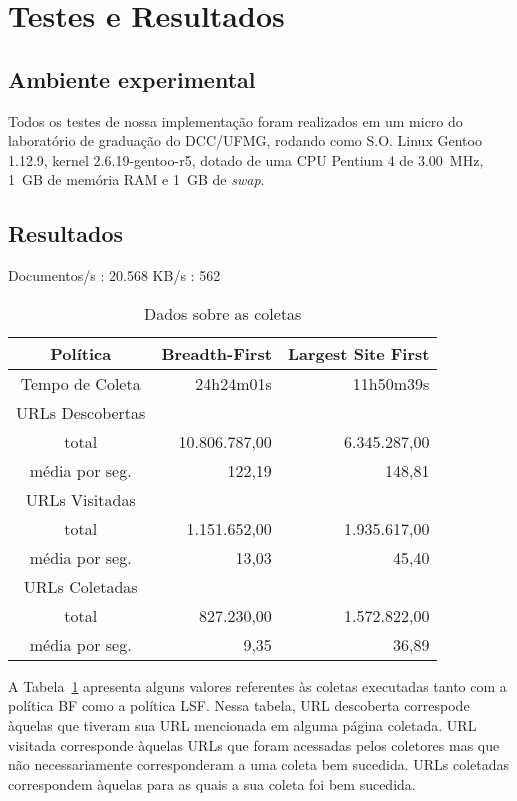 \documentclass[10pt,twocolumn]{article}
\begin{document}
\section{Testes e Resultados}

\subsection{Ambiente experimental}

Todos os testes de nossa implementação foram realizados em um micro do
laboratório de graduação do DCC/UFMG, rodando como S.O. Linux Gentoo
1.12.9, kernel 2.6.19-gentoo-r5, dotado de uma CPU Pentium 4 de
3.00~MHz, 1~GB de memória RAM e 1~GB de \emph{swap}.

\subsection{Resultados}

Documentos/s : 20.568
KB/s : 562


\begin{table}[htbp]
\centering
\begin{tabular}{|c|r|r|} \hline
Política	&  Breadth-First	& Largest Site First	\\
\hline\hline
Tempo de Coleta &   24h24m01s		&	11h50m39s	\\\hline
URLs Descobertas& & \\
	total	& 	10.806.787,00	&	6.345.287,00	\\
média por seg.	&		122,19  &	      148,81	\\\hline
URLs Visitadas	& & \\
	total	& 	  1.151.652,00	&	1.935.617,00	\\
média por seg.	&		 13,03  &	       45,40	\\\hline
URLs Coletadas	& & \\
	total	& 	    827.230,00	&	1.572.822,00	\\
média por seg.	&		  9,35  & 	       36,89	\\\hline
\hline
\end{tabular}
\caption{Dados sobre as coletas}
\label{tab:sumario}
\end{table}


A Tabela~\ref{tab:sumario} apresenta alguns valores referentes às
coletas executadas tanto com a política BF como a política LSF.
Nessa tabela, URL descoberta correspode àquelas que tiveram sua URL
mencionada em alguma página coletada. URL visitada corresponde àquelas
URLs que foram acessadas pelos coletores mas que não necessariamente
corresponderam a uma coleta bem sucedida. URLs coletadas correspondem
àquelas para as quais a sua coleta foi bem sucedida.
\end{document}
